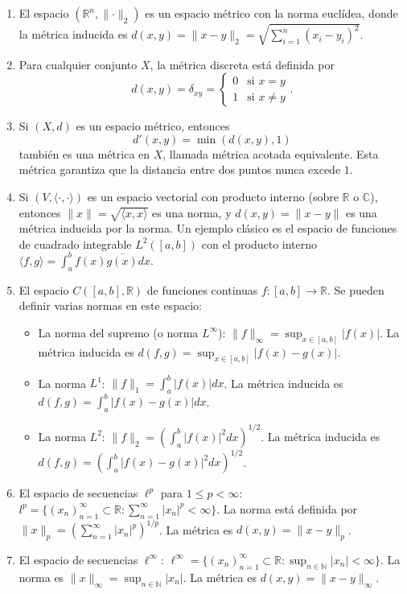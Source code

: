 \begin{example}
	\begin{enumerate}
		\item El espacio $(\mathbb{R}^{n}, \lVert \cdot \rVert_2)$ es un espacio métrico con la norma euclídea, donde la métrica inducida es $d(x, y) = \lVert x - y \rVert_2 = \sqrt{\sum_{i=1}^n (x_i - y_i)^2}$.

		\item Para cualquier conjunto $X$, la métrica discreta está definida por $$d(x, y) = \delta_{xy} = \begin{cases} 0 & \text{si } x = y \\ 1 & \text{si } x \neq y \end{cases}.$$

		\item Si $(X, d)$ es un espacio métrico, entonces
		      \begin{equation*}
			      d'(x, y) = \min(d(x, y), 1)
		      \end{equation*}
		      también es una métrica en $X$, llamada métrica acotada equivalente. Esta métrica garantiza que la distancia entre dos puntos nunca excede $1$.

		\item Si $(V, \langle \cdot, \cdot \rangle)$ es un espacio vectorial con producto interno (sobre $\mathbb{R}$ o $\mathbb{C}$), entonces $\|x\| = \sqrt{\langle x, x \rangle}$ es una norma, y $d(x, y) = \|x - y\|$ es una métrica inducida por la norma. Un ejemplo clásico es el espacio de funciones de cuadrado integrable $L^2([a, b])$ con el producto interno $\langle f, g \rangle = \int_a^b f(x)\overline{g(x)} dx$.

		\item El espacio $C([a, b], \mathbb{R})$ de funciones continuas $f: [a, b] \to \mathbb{R}$. Se pueden definir varias normas en este espacio:
		      \begin{itemize}
			      \item La norma del supremo (o norma $L^\infty$): $\|f\|_\infty = \sup_{x \in [a, b]} |f(x)|$. La métrica inducida es $d(f, g) = \sup_{x \in [a, b]} |f(x) - g(x)|$.
			      \item La norma $L^1$: $\|f\|_1 = \int_a^b |f(x)| dx$. La métrica inducida es $d(f, g) = \int_a^b |f(x) - g(x)| dx$.
			      \item La norma $L^2$: $\|f\|_2 = \left( \int_a^b |f(x)|^2 dx \right)^{1/2}$. La métrica inducida es $d(f, g) = \left( \int_a^b |f(x) - g(x)|^2 dx \right)^{1/2}$.
		      \end{itemize}
		\item El espacio de secuencias $\ell^p$ para $1 \le p < \infty$: $l^p = \{ (x_n)_{n=1}^\infty \subset \mathbb{R} : \sum_{n=1}^\infty |x_n|^p < \infty \}$. La norma está definida por $\|x\|_p = \left( \sum_{n=1}^\infty |x_n|^p \right)^{1/p}$. La métrica es $d(x, y) = \|x - y\|_p$.
		\item El espacio de secuencias $\ell^\infty$: $\ell^\infty = \{ (x_n)_{n=1}^\infty \subset \mathbb{R} : \sup_{n \in \mathbb{N}} |x_n| < \infty \}$. La norma es $\|x\|_\infty = \sup_{n \in \mathbb{N}} |x_n|$. La métrica es $d(x, y) = \|x - y\|_\infty$.
	\end{enumerate}
\end{example}

